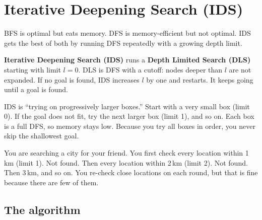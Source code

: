 \documentclass[a4paper,11pt]{article}
\newcommand{\vocab}[1]{\textbf{\color{navy}#1}}
\begin{document}
\section{Iterative Deepening Search (IDS)}

BFS is optimal but eats memory. DFS is memory-efficient but not optimal. IDS
gets the best of both by running DFS repeatedly with a growing depth limit.

\vocab{Iterative Deepening Search (IDS)} runs a
\vocab{Depth Limited Search (DLS)} starting with limit $l=0$. DLS is DFS with
a cutoff: nodes deeper than $l$ are not expanded. If no goal is found, IDS
increases $l$ by one and restarts. It keeps going until a goal is found.

\begin{intuition}
IDS is ``trying on progressively larger boxes.'' Start with a very small box
(limit 0). If the goal does not fit, try the next larger box (limit 1), and
so on. Each box is a full DFS, so memory stays low. Because you try all boxes
in order, you never skip the shallowest goal.
\end{intuition}

\begin{everyday}
You are searching a city for your friend. You first check every location
within 1\,km (limit 1). Not found. Then every location within 2\,km (limit 2).
Not found. Then 3\,km, and so on. You re-check close locations on each
round, but that is fine because there are few of them.
\end{everyday}

\subsection*{The algorithm}

\begin{center}
\end{center}
\end{document}
